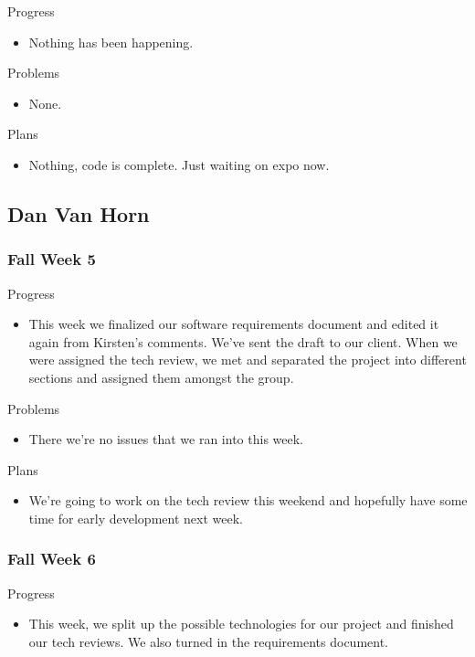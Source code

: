         \noindent
        Progress
        \begin{itemize}
            \item Nothing has been happening.
        \end{itemize}
        
        \noindent
        Problems
        \begin{itemize}
            \item None.
        \end{itemize}
        
        \noindent
        Plans
        \begin{itemize}
            \item Nothing, code is complete.  Just waiting on expo now.
        \end{itemize}

\subsection{Dan Van Horn}
    \subsubsection{Fall Week 5}
        \noindent
        Progress
        \begin{itemize}
            \item This week we finalized our software requirements document and edited it again from Kirsten’s comments. We’ve sent the draft to our client. When we were assigned the tech review, we met and separated the project into different sections and assigned them amongst the group.
        \end{itemize}
        
        \noindent
        Problems
        \begin{itemize}
            \item There we’re no issues that we ran into this week.
        \end{itemize}
        
        \noindent
        Plans
        \begin{itemize}
            \item We’re going to work on the tech review this weekend and hopefully have some time for early development next week.
        \end{itemize}
    \subsubsection{Fall Week 6}
        \noindent
        Progress
        \begin{itemize}
            \item This week, we split up the possible technologies for our project and finished our tech reviews. We also turned in the requirements document. 
        \end{itemize}
        

